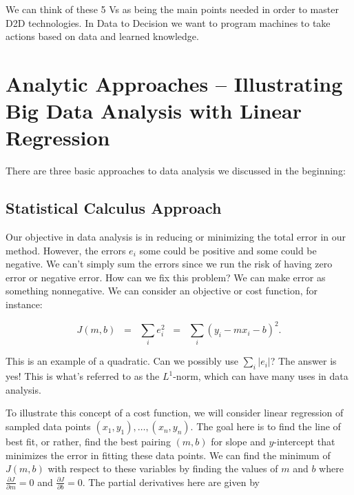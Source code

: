 \documentclass{article}
\begin{document}
\noindent We can think of these 5 Vs as being the main points needed in order to master D2D technologies.  In Data to Decision we want to program machines to take actions based on data and learned knowledge.

\section{Analytic Approaches -- Illustrating Big Data Analysis with Linear Regression}

\noindent There are three basic approaches to data analysis we discussed in the beginning:

\subsection{Statistical Calculus Approach}

\noindent Our objective in data analysis is in reducing or minimizing the total error in our method.  However, the errors $e_i$ some could be positive and some could be negative.  We can't simply sum the errors since we run the risk of having zero error or negative error.  How can we fix this problem?  We can make error as something nonnegative.  We can consider an objective or cost function, for instance:

\begin{equation*}
J(m,b) \;\; =\;\; \sum_i e_i^2 \;\; =\;\; \sum_i (y_i - mx_i - b)^2.
\end{equation*}

\noindent This is an example of a quadratic.  Can we possibly use $\sum_i |e_i|$?  The answer is yes!  This is what's referred to as the $L^1$-norm, which can have many uses in data analysis.  

\vspace{1pc}

\noindent To illustrate this concept of a cost function, we will consider linear regression of sampled data points $(x_1, y_1), \ldots, (x_n, y_n)$.  The goal here is to find the line of best fit, or rather, find the best pairing $(m,b)$ for slope and $y$-intercept that minimizes the error in fitting these data points.  We can find the minimum of $J(m,b)$ with respect to these variables by finding the values of $m$ and $b$ where $\frac{\partial J}{\partial m} = 0$ and $\frac{\partial J}{\partial b} = 0$.  The partial derivatives here are given by 
\end{document}
